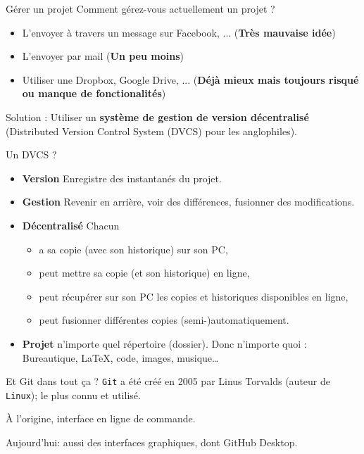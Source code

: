 \documentclass{beamer}
\begin{document}
\begin{frame}{Gérer un projet}
Comment gérez-vous actuellement un projet ?

\begin{itemize}
    \item L'envoyer à travers un message sur Facebook, ... (\textbf{Très mauvaise idée})
    \item L'envoyer par mail (\textbf{Un peu moins})
    \item Utiliser une Dropbox, Google Drive, ... (\textbf{Déjà mieux mais toujours risqué ou manque de fonctionalités})
\end{itemize}

Solution : Utiliser un \textbf{système de gestion de version décentralisé}
(Distributed Version Control System (DVCS) pour les anglophiles).
\end{frame}

\begin{frame}{Un DVCS ?}
    \begin{itemize}
        \item \textbf{Version} Enregistre des \og{}instantanés\fg{} du projet.
        \item \textbf{Gestion} Revenir en arrière, voir des différences,
            fusionner des modifications.
        \item \textbf{Décentralisé} Chacun
            \begin{itemize}
                \item a sa copie (avec son historique) sur son PC,
                \item peut mettre sa copie (et son historique) en ligne,
                \item peut récupérer sur son PC les copies et historiques disponibles en ligne,
                \item peut fusionner différentes copies (semi-)automatiquement.
            \end{itemize}
        \item \textbf{Projet} n'importe quel répertoire (\og dossier\fg). Donc
            n'importe quoi : Bureautique, \LaTeX, code, images, musique\dots
    \end{itemize}
\end{frame}

\begin{frame}{Et Git dans tout ça ?}
\texttt{Git} a été créé en 2005 par Linus Torvalds (auteur de
\texttt{Linux}); le plus connu et utilisé.

À l'origine, interface en ligne de commande.

Aujourd'hui: aussi des interfaces graphiques, dont GitHub Desktop.
\end{frame}
\end{document}
